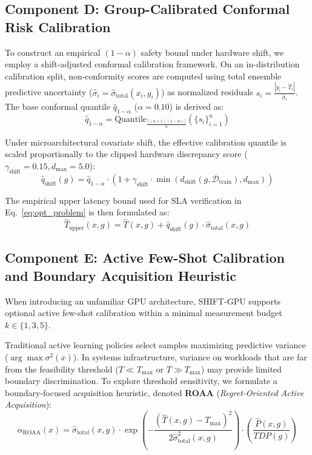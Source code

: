 \documentclass[preprint,12pt]{elsarticle}
\begin{document}
\subsection{Component D: Group-Calibrated Conformal Risk Calibration}
To construct an empirical $(1-\alpha)$ safety bound under hardware shift, we employ a shift-adjusted conformal calibration framework. On an in-distribution calibration split, non-conformity scores are computed using total ensemble predictive uncertainty ($\hat{\sigma}_i = \hat{\sigma}_{\text{total}}(x_i, g_i)$) as normalized residuals $s_i = \frac{|y_i - \hat{T}_i|}{\hat{\sigma}_i}$. The base conformal quantile $\hat{q}_{1-\alpha}$ ($\alpha = 0.10$) is derived as:
\begin{equation}
\hat{q}_{1-\alpha} = \text{Quantile}_{\frac{\lceil (n+1)(1-\alpha) \rceil}{n}}\left(\{s_i\}_{i=1}^n\right)
\end{equation}

Under microarchitectural covariate shift, the effective calibration quantile is scaled proportionally to the clipped hardware discrepancy score ($\gamma_{\text{shift}} = 0.15, d_{\max} = 5.0$):
\begin{equation}
\hat{q}_{\text{shift}}(g) = \hat{q}_{1-\alpha} \cdot \left(1 + \gamma_{\text{shift}} \cdot \min\left(d_{\text{shift}}(g, \mathcal{D}_{\text{train}}), d_{\max}\right)\right)
\end{equation}

The empirical upper latency bound used for SLA verification in Eq.~\eqref{eq:opt_problem} is then formulated as:
\begin{equation}
\hat{T}_{\text{upper}}(x, g) = \hat{T}(x, g) + \hat{q}_{\text{shift}}(g) \cdot \hat{\sigma}_{\text{total}}(x, g)
\end{equation}

\subsection{Component E: Active Few-Shot Calibration and Boundary Acquisition Heuristic}
When introducing an unfamiliar GPU architecture, SHIFT-GPU supports optional active few-shot calibration within a minimal measurement budget $k \in \{1, 3, 5\}$.

Traditional active learning policies select samples maximizing predictive variance ($\arg\max \sigma^2(x)$). In systems infrastructure, variance on workloads that are far from the feasibility threshold ($T \ll T_{\max}$ or $T \gg T_{\max}$) may provide limited boundary discrimination. To explore threshold sensitivity, we formulate a boundary-focused acquisition heuristic, denoted \textbf{ROAA} (\textit{Regret-Oriented Active Acquisition}):
\begin{equation}
\label{eq:roaa}
\alpha_{\text{ROAA}}(x) = \hat{\sigma}_{\text{total}}(x, g) \cdot \exp\left( - \frac{(\hat{T}(x, g) - T_{\max})^2}{2 \hat{\sigma}_{\text{total}}^2(x, g)} \right) \cdot \left(\frac{\hat{P}(x, g)}{TDP(g)}\right)
\end{equation}
\end{document}
